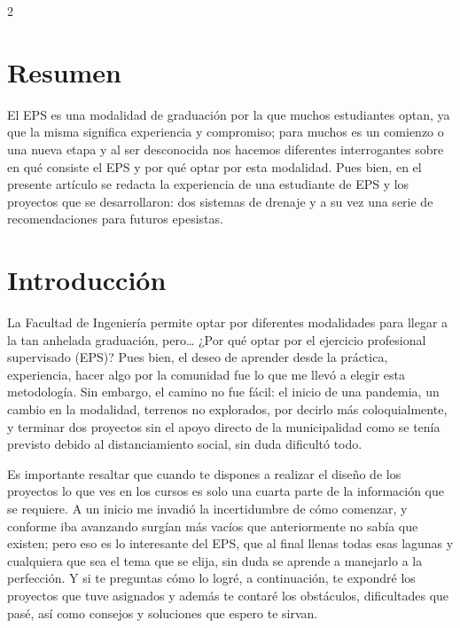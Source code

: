 \documentclass[12pt,spanish,Letterpaper,openany]{book}
\begin{document}
\begin {multicols}{2}

\hypertarget{resumen-1}{%
\section{Resumen}\label{resumen-1}}

El EPS es una modalidad de graduación por la que muchos estudiantes optan, ya que la misma significa experiencia y compromiso; para muchos es un comienzo o una nueva etapa y al ser desconocida nos hacemos diferentes interrogantes sobre en qué consiste el EPS y por qué optar por esta modalidad. Pues bien, en el presente artículo se redacta la experiencia de una estudiante de EPS y los proyectos que se desarrollaron: dos sistemas de drenaje y a su vez una serie de recomendaciones para futuros epesistas.

\hypertarget{introducciuxf3n-2}{%
\section{Introducción}\label{introducciuxf3n-2}}

La Facultad de Ingeniería permite optar por diferentes modalidades para llegar a la tan anhelada graduación, pero\ldots{} ¿Por qué optar por el ejercicio profesional supervisado (EPS)? Pues bien, el deseo de aprender desde la práctica, experiencia, hacer algo por la comunidad fue lo que me llevó a elegir esta metodología. Sin embargo, el camino no fue fácil: el inicio de una pandemia, un cambio en la modalidad, terrenos no explorados, por decirlo más coloquialmente, y terminar dos proyectos sin el apoyo directo de la municipalidad como se tenía previsto debido al distanciamiento social, sin duda dificultó todo.

Es importante resaltar que cuando te dispones a realizar el diseño de los proyectos lo que ves en los cursos es solo una cuarta parte de la información que se requiere. A un inicio me invadió la incertidumbre de cómo comenzar, y conforme iba avanzando surgían más vacíos que anteriormente no sabía que existen; pero eso es lo interesante del EPS, que al final llenas todas esas lagunas y cualquiera que sea el tema que se elija, sin duda se aprende a manejarlo a la perfección. Y si te preguntas cómo lo logré, a continuación, te expondré los proyectos que tuve asignados y además te contaré los obstáculos, dificultades que pasé, así como consejos y soluciones que espero te sirvan.

\hypertarget{artuxedculo-1}{%
}
\end{multicols}
\end{document}
